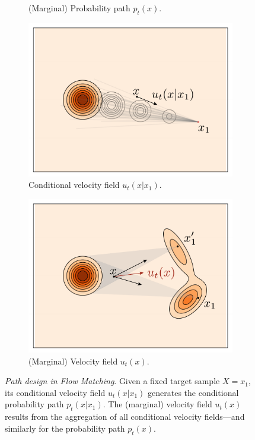 \documentclass{fairmeta}
\numberwithin{equation}{section}
\begin{document}
\begin{figure}
\begin{subfigure}[b]{0.24\textwidth}
\caption{(Marginal) Probability path $p_t(x)$.}
\label{fig:marginal_p_t}
\end{subfigure}
\hfill
\begin{subfigure}[b]{0.24\textwidth}
\centering
\includegraphics[width=\textwidth]{assets/recepie/fm_recepie_2.pdf}
\caption{Conditional velocity field $u_t(x | x_1)$.}
\label{fig:u_t}
\end{subfigure}
\hfill
\begin{subfigure}[b]{0.24\textwidth}
\centering
\includegraphics[width=\textwidth]{assets/cond_E_u.pdf}
\caption{(Marginal) Velocity field $u_t(x)$.}
\label{fig:marginal_u_t}
\end{subfigure}
\caption{\emph{Path design in Flow Matching}. Given a fixed target sample $X=x_1$, its conditional velocity field $u_t(x|x_1)$ generates the conditional probability path $p_t(x|x_1)$.
  The (marginal) velocity field $u_t(x)$ results from the aggregation of all conditional velocity fields---and similarly for the probability path $p_t(x)$. }
\end{figure}
  
\end{document}
